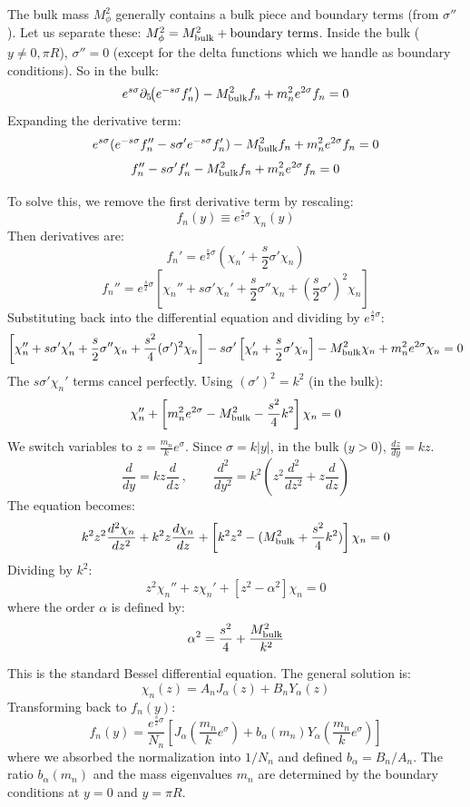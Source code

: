 \documentclass[11pt]{article}
\begin{document}
The bulk mass $M_\phi^2$ generally contains a bulk piece and boundary terms (from $\sigma''$). Let us separate these: $M_\phi^2 = M_{\rm bulk}^2 + \text{boundary terms}$.
Inside the bulk ($y \neq 0, \pi R$), $\sigma''=0$ (except for the delta functions which we handle as boundary conditions).
So in the bulk:
\[
e^{s\sigma}\partial_5\!\big(e^{-s\sigma} f_n'\big) - M_{\rm bulk}^2 f_n + m_n^2 e^{2\sigma} f_n = 0
\]
Expanding the derivative term:
\[
e^{s\sigma}(e^{-s\sigma} f_n'' - s \sigma' e^{-s\sigma} f_n') - M_{\rm bulk}^2 f_n + m_n^2 e^{2\sigma} f_n = 0
\]
\[
f_n'' - s \sigma' f_n' - M_{\rm bulk}^2 f_n + m_n^2 e^{2\sigma} f_n = 0
\]

To solve this, we remove the first derivative term by rescaling:
\[
f_n(y)\equiv e^{\frac{s}{2}\sigma}\,\chi_n(y)
\]
Then derivatives are:
\[
f_n' = e^{\frac{s}{2}\sigma} (\chi_n' + \frac{s}{2}\sigma' \chi_n)
\]
\[
f_n'' = e^{\frac{s}{2}\sigma} \left[ \chi_n'' + s\sigma'\chi_n' + \frac{s}{2}\sigma''\chi_n + (\frac{s}{2}\sigma')^2\chi_n \right]
\]
Substituting back into the differential equation and dividing by $e^{\frac{s}{2}\sigma}$:
\[
\left[ \chi_n'' + s\sigma'\chi_n' + \frac{s}{2}\sigma''\chi_n + \frac{s^2}{4}(\sigma')^2\chi_n \right]
- s\sigma' \left[ \chi_n' + \frac{s}{2}\sigma'\chi_n \right]
- M_{\rm bulk}^2 \chi_n + m_n^2 e^{2\sigma} \chi_n = 0
\]
The $s\sigma'\chi_n'$ terms cancel perfectly.
Using $(\sigma')^2 = k^2$ (in the bulk):
\[
\chi_n'' + \left[ m_n^2 e^{2\sigma} - M_{\rm bulk}^2 - \frac{s^2}{4}k^2 \right] \chi_n = 0
\]
We switch variables to $z = \frac{m_n}{k} e^\sigma$. Since $\sigma = k|y|$, in the bulk ($y>0$), $\frac{dz}{dy} = k z$.
\[
\frac{d}{dy} = kz \frac{d}{dz} \, , \qquad \frac{d^2}{dy^2} = k^2 \left( z^2 \frac{d^2}{dz^2} + z \frac{d}{dz} \right)
\]
The equation becomes:
\[
k^2 z^2 \frac{d^2 \chi_n}{dz^2} + k^2 z \frac{d \chi_n}{dz} + \left[ k^2 z^2 - (M_{\rm bulk}^2 + \frac{s^2}{4}k^2) \right] \chi_n = 0
\]
Dividing by $k^2$:
\[
z^2 \chi_n'' + z \chi_n' + \left[ z^2 - \alpha^2 \right] \chi_n = 0
\]
where the order $\alpha$ is defined by:
\[
\alpha^2 = \frac{s^2}{4} + \frac{M_{\rm bulk}^2}{k^2}
\]

This is the standard Bessel differential equation. The general solution is:
\[
\chi_n(z) = A_n J_\alpha(z) + B_n Y_\alpha(z)
\]
Transforming back to $f_n(y)$:
\[
f_n(y) = \frac{e^{\frac{s}{2}\sigma}}{N_n} \left[ J_\alpha\left( \frac{m_n}{k}e^\sigma \right) + b_\alpha(m_n) Y_\alpha\left( \frac{m_n}{k}e^\sigma \right) \right]
\]
where we absorbed the normalization into $1/N_n$ and defined $b_\alpha = B_n/A_n$. The ratio $b_\alpha(m_n)$ and the mass eigenvalues $m_n$ are determined by the boundary conditions at $y=0$ and $y=\pi R$.
\end{document}
